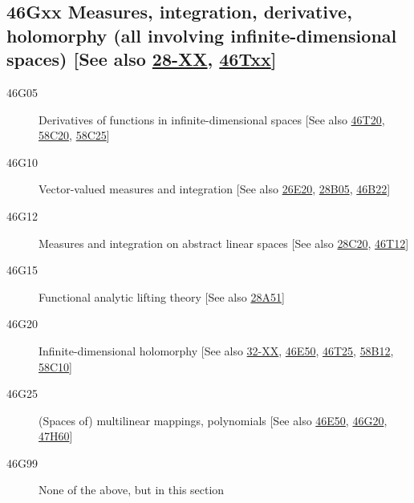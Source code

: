 \subsection*{46Gxx  Measures, integration, derivative, holomorphy (all involving infinite-\newline dimensional spaces) [See also \hyperref[28-XX]{28-XX}, \hyperref[46Txx]{46Txx}]}\label{46Gxx}
\begin{description}  
\item [46G05]\label{46G05} Derivatives of functions in infinite-dimensional spaces [See also \hyperref[46T20]{46T20}, \hyperref[58C20]{58C20}, \hyperref[58C25]{58C25}]
\item [46G10]\label{46G10} Vector-valued measures and integration [See also \hyperref[26E20]{26E20}, \hyperref[28B05]{28B05}, \hyperref[46B22]{46B22}]
\item [46G12]\label{46G12} Measures and integration on abstract linear spaces [See also \hyperref[28C20]{28C20}, \hyperref[46T12]{46T12}]
\item [46G15]\label{46G15} Functional analytic lifting theory [See also \hyperref[28A51]{28A51}]
\item [46G20]\label{46G20} Infinite-dimensional holomorphy [See also \hyperref[32-XX]{32-XX}, \hyperref[46E50]{46E50}, \hyperref[46T25]{46T25}, \hyperref[58B12]{58B12}, \hyperref[58C10]{58C10}]
\item [46G25]\label{46G25} (Spaces of) multilinear mappings, polynomials [See also \hyperref[46E50]{46E50}, \hyperref[46G20]{46G20}, \hyperref[47H60]{47H60}]
\item [46G99]\label{46G99} None of the above, but in this section
\end{description}
